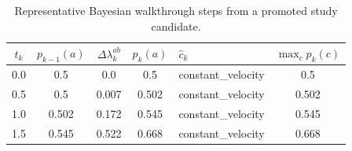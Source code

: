 \begin{table}[htbp]
\centering
\caption{Representative Bayesian walkthrough steps from a promoted study candidate.}
\label{tab:bayes_walkthrough}
\begin{tabularx}{\textwidth}{cccclc}
\toprule
$t_k$ & $p_{k-1}(a)$ & $\Delta \lambda_k^{ab}$ & $p_k(a)$ & $\hat{c}_k$ & $\max_c p_k(c)$ \\
\midrule
0.0 & 0.5 & 0.0 & 0.5 & constant\_velocity & 0.5 \\
0.5 & 0.5 & 0.007 & 0.502 & constant\_velocity & 0.502 \\
1.0 & 0.502 & 0.172 & 0.545 & constant\_velocity & 0.545 \\
1.5 & 0.545 & 0.522 & 0.668 & constant\_velocity & 0.668 \\
\bottomrule
\end{tabularx}
\end{table}